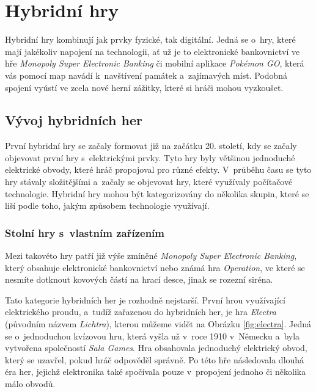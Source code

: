 \chapter{Hybridní hry}
Hybridní hry kombinují jak prvky fyzické, tak digitální. Jedná se o~hry, které mají jakékoliv napojení na technologii, ať už je to elektronické bankovnictví ve hře \textit{Monopoly Super Electronic Banking} či mobilní aplikace \textit{Pokémon GO}, která vás pomocí map navádí k~navštívení památek a~zajímavých míst. Podobná spojení vyústí ve zcela nové herní zážitky, které si hráči mohou vyzkoušet. \cite{hybrid_board_games_design}

\section{Vývoj hybridních her}
První hybridní hry se začaly formovat již na začátku 20. století, kdy se začaly objevovat první hry s~elektrickými prvky. Tyto hry byly většinou jednoduché elektrické obvody, které hráč propojoval pro různé efekty. V~průběhu času se tyto hry stávaly složitějšími a~začaly se objevovat hry, které využívaly počítačové technologie. Hybridní hry mohou být kategorizovány do několika skupin, které se liší podle toho, jakým způsobem technologie využívají. \cite{history_of_hybrid_games}

\subsection{Stolní hry s~vlastním zařízením}
Mezi takovéto hry patří již výše zmíněné \textit{Monopoly Super Electronic Banking}, který obsahuje elektronické bankovnictví nebo známá hra \textit{Operation}, ve které se nesmíte dotknout kovových částí na hrací desce, jinak se rozezní siréna. 

Tato kategorie hybridních her je rozhodně nejstarší. První hrou využívající elektrického proudu, a~tudíž zařazenou do hybridních her, je hra \textit{Electra} (původním názvem \textit{Lichtra}), kterou můžeme vidět na Obrázku \ref{fig:electra}. Jedná se o~jednoduchou kvízovou hru, která vyšla už v~roce 1910 v~Německu a~byla vytvořena společností \textit{Sala Games}. Hra obsahovala jednoduchý elektrický obvod, který se uzavřel, pokud hráč odpověděl správně. Po této hře následovala dlouhá éra her, jejichž elektronika také spočívala pouze v~propojení jednoho či několika málo obvodů. \cite{history_of_hybrid_games, boardgames_with_apps}

